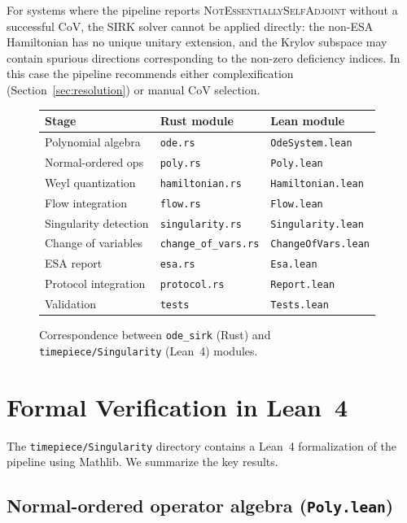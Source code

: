 \documentclass[11pt,a4paper]{article}
\begin{document}
For systems where the pipeline reports
\textsc{NotEssentiallySelfAdjoint} without a successful CoV, the SIRK
solver cannot be applied directly: the non-ESA Hamiltonian has no unique
unitary extension, and the Krylov subspace may contain spurious
directions corresponding to the non-zero deficiency indices.  In this
case the pipeline recommends either complexification
(Section~\ref{sec:resolution}) or manual CoV selection.

\begin{figure}[h]
\centering
\begin{tabular}{@{}lll@{}}
\toprule
\textbf{Stage} & \textbf{Rust module} & \textbf{Lean module} \\
\midrule
Polynomial algebra & \texttt{ode.rs} & \texttt{OdeSystem.lean} \\
Normal-ordered ops & \texttt{poly.rs} & \texttt{Poly.lean} \\
Weyl quantization & \texttt{hamiltonian.rs} & \texttt{Hamiltonian.lean} \\
Flow integration & \texttt{flow.rs} & \texttt{Flow.lean} \\
Singularity detection & \texttt{singularity.rs} & \texttt{Singularity.lean} \\
Change of variables & \texttt{change\_of\_vars.rs} & \texttt{ChangeOfVars.lean} \\
ESA report & \texttt{esa.rs} & \texttt{Esa.lean} \\
Protocol integration & \texttt{protocol.rs} & \texttt{Report.lean} \\
Validation & \texttt{tests} & \texttt{Tests.lean} \\
\bottomrule
\end{tabular}
\caption{Correspondence between \texttt{ode\_sirk} (Rust) and
\texttt{timepiece/Singularity} (Lean~4) modules.}
\end{figure}

\section{Formal Verification in Lean~4}\label{sec:lean}

The \texttt{timepiece/Singularity} directory contains a Lean~4
formalization of the pipeline using Mathlib.  We summarize the key
results.

\subsection{Normal-ordered operator algebra (\texttt{Poly.lean})}
\end{document}
